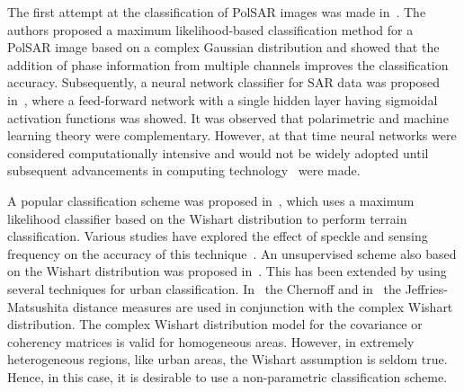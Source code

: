 The first attempt at the classification of PolSAR images was made in~\cite{kong1988identification}. The authors proposed a maximum likelihood-based classification method for a PolSAR image based on a complex Gaussian distribution and showed that the addition of phase information from multiple channels improves the classification accuracy. Subsequently, a neural network classifier for SAR data was proposed in~\cite{pottier1991radar}, where a feed-forward network with a single hidden layer having sigmoidal activation functions was showed. It was observed that polarimetric and machine learning theory were complementary. However, at that time neural networks were considered computationally intensive and would not be widely adopted until subsequent advancements in computing technology~\cite{anderson1995introduction} were made.

A popular classification scheme was proposed in~\cite{lee1994classification}, which uses a maximum likelihood classifier based on the Wishart distribution to perform terrain classification. Various studies have explored the effect of speckle and sensing frequency on the accuracy of this technique~\cite{lee2001quantitative}. An unsupervised scheme also based on the Wishart distribution was proposed in~\cite{lee2004unsupervised}. This has been extended by using several techniques for urban classification. In~\cite{dabboor2013unsupervised} the Chernoff  and in~\cite{dabboor2014jeffries} the Jeffries-Matsushita distance measures are used in conjunction with the complex Wishart distribution. 
The complex Wishart distribution model for the covariance or coherency matrices is valid for homogeneous areas. %
However, in extremely heterogeneous regions, like urban areas, the Wishart assumption    is seldom true. Hence, in this case, it is desirable to use a non-parametric classification scheme. 


